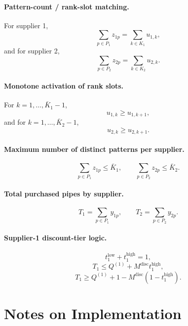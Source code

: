 \paragraph{Pattern-count / rank-slot matching.}
For supplier 1,
\[
\sum_{p\in P_1} z_{1p} = \sum_{k\in K_1} u_{1,k},
\]
and for supplier 2,
\[
\sum_{p\in P_2} z_{2p} = \sum_{k\in K_2} u_{2,k}.
\]

\paragraph{Monotone activation of rank slots.}
For $k=1,\dots,\bar K_1-1$,
\[
u_{1,k} \ge u_{1,k+1},
\]
and for $k=1,\dots,\bar K_2-1$,
\[
u_{2,k} \ge u_{2,k+1}.
\]

\paragraph{Maximum number of distinct patterns per supplier.}
\[
\sum_{p\in P_1} z_{1p} \le \bar K_1,\qquad
\sum_{p\in P_2} z_{2p} \le \bar K_2.
\]

\paragraph{Total purchased pipes by supplier.}
\[
T_1=\sum_{p\in P_1} y_{1p},\qquad
T_2=\sum_{p\in P_2} y_{2p}.
\]

\paragraph{Supplier-1 discount-tier logic.}
\[
t^{\text{low}}_1 + t^{\text{high}}_1 = 1,
\]
\[
T_1 \le Q^{(1)} + M^{\text{disc}} t^{\text{high}}_1,
\]
\[
T_1 \ge Q^{(1)} + 1 - M^{\text{disc}}(1-t^{\text{high}}_1).
\]

\section*{Notes on Implementation}

